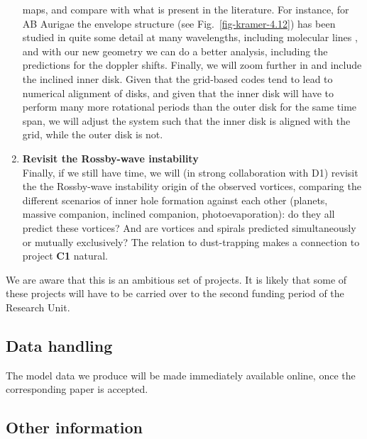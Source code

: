 \documentclass[10pt,fleqn,twoside]{article}
\begin{document}
\begin{enumerate}
  maps, and compare with what is present in the literature. For instance,
  for AB Aurigae the envelope structure (see Fig.~\ref{fig-kramer-4.12}) has
  been studied in quite some detail at many wavelengths, including molecular
  lines \citep{2005ApJ...621..853S}, and with our new geometry we can do a
  better analysis, including the predictions for the doppler shifts.
  Finally, we will zoom further in and include the inclined inner
  disk. Given that the grid-based codes tend to lead to numerical alignment
  of disks, and given that the inner disk will have to perform many more
  rotational periods than the outer disk for the same time span, we will
  adjust the system such that the inner disk is aligned with the grid, while
  the outer disk is not.
\item {\bf Revisit the Rossby-wave instability}\\
  Finally, if we still have time, we will (in strong collaboration with D1)
  revisit the the Rossby-wave instability origin of the observed vortices,
  comparing the different scenarios of inner hole formation against each
  other (planets, massive companion, inclined companion, photoevaporation):
  do they all predict these vortices? And are vortices and spirals predicted
  simultaneously or mutually exclusively? The relation to dust-trapping
  makes a connection to project {\bf C1} natural. 
\end{enumerate}

We are aware that this is an ambitious set of projects. It is likely that
some of these projects will have to be carried over to the second funding
period of the Research Unit.



\subsection{Data handling}
The model data we produce will be made immediately available online, once
the corresponding paper is accepted. 

\subsection{Other information}
\end{document}
